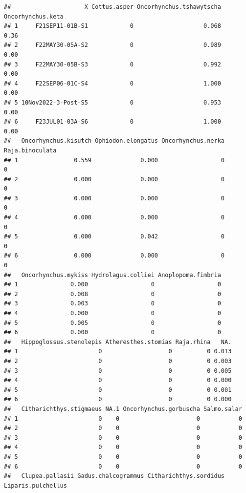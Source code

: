 \documentclass[
]{article}
\begin{document}
\begin{verbatim}
##                     X Cottus.asper Oncorhynchus.tshawytscha Oncorhynchus.keta
## 1     F21SEP11-01B-S1            0                    0.068              0.36
## 2     F22MAY30-05A-S2            0                    0.989              0.00
## 3     F22MAY30-05B-S3            0                    0.992              0.00
## 4     F22SEP06-01C-S4            0                    1.000              0.00
## 5 10Nov2022-3-Post-S5            0                    0.953              0.00
## 6     F23JUL01-03A-S6            0                    1.000              0.00
##   Oncorhynchus.kisutch Ophiodon.elongatus Oncorhynchus.nerka Raja.binoculata
## 1                0.559              0.000                  0               0
## 2                0.000              0.000                  0               0
## 3                0.000              0.000                  0               0
## 4                0.000              0.000                  0               0
## 5                0.000              0.042                  0               0
## 6                0.000              0.000                  0               0
##   Oncorhynchus.mykiss Hydrolagus.colliei Anoplopoma.fimbria
## 1               0.000                  0                  0
## 2               0.008                  0                  0
## 3               0.003                  0                  0
## 4               0.000                  0                  0
## 5               0.005                  0                  0
## 6               0.000                  0                  0
##   Hippoglossus.stenolepis Atheresthes.stomias Raja.rhina   NA.
## 1                       0                   0          0 0.013
## 2                       0                   0          0 0.003
## 3                       0                   0          0 0.005
## 4                       0                   0          0 0.000
## 5                       0                   0          0 0.001
## 6                       0                   0          0 0.000
##   Citharichthys.stigmaeus NA.1 Oncorhynchus.gorbuscha Salmo.salar
## 1                       0    0                      0           0
## 2                       0    0                      0           0
## 3                       0    0                      0           0
## 4                       0    0                      0           0
## 5                       0    0                      0           0
## 6                       0    0                      0           0
##   Clupea.pallasii Gadus.chalcogrammus Citharichthys.sordidus Liparis.pulchellus

\end{verbatim}
\end{document}

